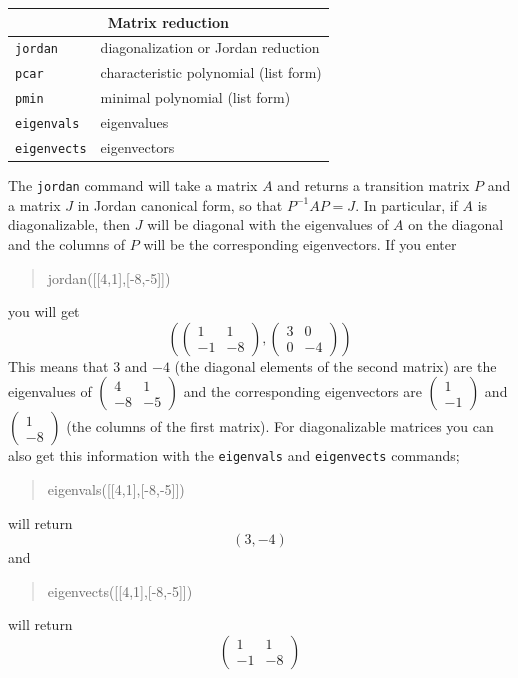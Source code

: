 \documentclass{article}
\newcommand{\xcasin}[1]
{\begin{quote}\ttfamily
#1
\end{quote}}
\newcommand{\xcasout}[1]
{\begin{equation*}
#1
\end{equation*}}
\begin{document}
\begin{center}
\begin{tabular}{|p{}|p{}|}
\hline
\multicolumn{2}{|c|}{\textbf{Matrix reduction}}\\
\hline\hline
\texttt{jordan} & diagonalization or Jordan reduction\\
\texttt{pcar} & characteristic polynomial (list form)\\
\texttt{pmin} & minimal polynomial (list form)\\
\texttt{eigenvals} & eigenvalues\\
\texttt{eigenvects} & eigenvectors\\
\hline
\end{tabular}
\end{center}

The \texttt{jordan} command will take a matrix $A$ and returns a
transition matrix $P$ and a matrix $J$ in Jordan canonical form, so
that $P^{-1} A P = J$.  In particular, if $A$ is diagonalizable, then
$J$ will be diagonal with the eigenvalues of $A$ on the diagonal and
the columns of $P$ will be the corresponding eigenvectors.
If you enter
\xcasin{jordan([[4,1],[-8,-5]])}
you will get
\xcasout{
\left(\begin{pmatrix}1 & 1\\ -1 & -8 \end{pmatrix},
      \begin{pmatrix}3 & 0\\ 0 & -4 \end{pmatrix}\right)}
This means that $3$ and $-4$ (the diagonal elements of the second
matrix) are the eigenvalues of 
$\begin{pmatrix}4 & 1\\-8 & -5\end{pmatrix}$ and the corresponding
eigenvectors are $\begin{pmatrix}1\\-1\end{pmatrix}$ and
$\begin{pmatrix}1\\-8\end{pmatrix}$ (the columns of the first matrix).
For diagonalizable matrices you can also get this information with the
\texttt{eigenvals} and \texttt{eigenvects} commands;
\xcasin{eigenvals([[4,1],[-8,-5]])}
will return
\xcasout{(3,-4)}
and 
\xcasin{eigenvects([[4,1],[-8,-5]])}
will return
\xcasout{\begin{pmatrix}1 & 1\\ -1 & -8 \end{pmatrix}}
\end{document}
